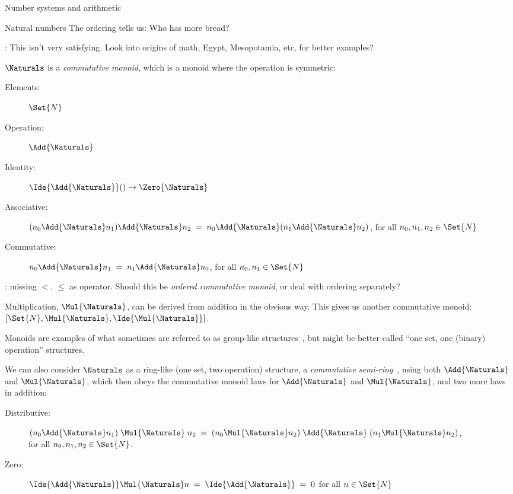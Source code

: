 \documentclass[12pt]{PalisadesLakesBook}
\begin{document}
\begin{plSection}{Number systems and arithmetic}
\begin{plSection}{Natural numbers}
The ordering tells us: Who has more bread?

\TODO: This isn't very satisfying.
Look into origins of math, Egypt, Mesopotamia, etc, for better
examples?

$\Naturals$ is  a \emph{commutative monoid},
which is a monoid where the operation is symmetric:
\begin{description}
\item[Elements:] $\Set{N}$
\item[Operation:] $\Add{\Naturals}$
\item[Identity:] $\Ide{\Add{\Naturals}}() \rightarrow \Zero{\Naturals}$
\item[Associative:] 
$(n_0 \Add{\Naturals} n_1) \Add{\Naturals} n_2 \;=\;
n_0 \Add{\Naturals} (n_1 \Add{\Naturals} n_2)$, 
for all $n_0, n_1, n_2 \in \Set{N}$
\item[Commutative:] $n_0 \Add{\Naturals} n_1 \;=\;
n_1 \Add{\Naturals} n_0$,
for all $n_0, n_1 \in \Set{N}$
\end{description}

\TODO: missing $<$, $\leq$ as operator.
Should this be \emph{ordered commutative monoid},
or deal with ordering separately?

Multiplication, $\Mul{\Naturals}$, can be derived from addition in the
obvious way.
This gives us another commutative monoid:
$[\Set{N}, \Mul{\Naturals}, \Ide{\Mul{\Naturals}}]$.

Monoids are examples of what sometimes are referred to 
as group-like structures~\cite{wiki:GroupLike},
but might be better called ``one set, one (binary) operation''
structures.

We can also consider $\Naturals$ as a ring-like
(one set, two operation)
structure, a \emph{commutative semi-ring}~\cite{wiki:Semiring}, 
using both $\Add{\Naturals}$ and $\Mul{\Naturals}$,
which then obeys the commutative monoid laws for
$\Add{\Naturals}$ and $\Mul{\Naturals}$, and two more laws in addition:
\begin{description}
\item[Distributive:] 
$(n_0 \Add{\Naturals} n_1) \; \Mul{\Naturals}\; n_2 \;=\;
(n_0 \Mul{\Naturals} n_2) \; \Add{\Naturals} \; (n_1 \Mul{\Naturals} n_2)$, \\
for all $n_0, n_1, n_2 \in \Set{N}$.
\item[Zero:] $\Ide{\Add{\Naturals}} \Mul{\Naturals} n 
\; = \; \Ide{\Add{\Naturals}}
\; = \; 0$ for all $n \in \Set{N}$
\end{description}


\end{plSection}
\end{plSection}
\end{document}
